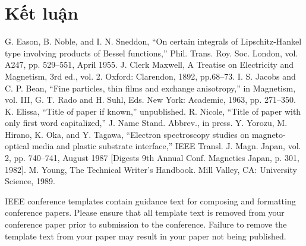 \documentclass[conference]{IEEEtran}
\theoremstyle{theoremst}
\begin{document}
\section{Kết luận}


\begin{thebibliography}{00}
 G. Eason, B. Noble, and I. N. Sneddon, ``On certain integrals of Lipschitz-Hankel type involving products of Bessel functions,'' Phil. Trans. Roy. Soc. London, vol. A247, pp. 529--551, April 1955.
 J. Clerk Maxwell, A Treatise on Electricity and Magnetism, 3rd ed., vol. 2. Oxford: Clarendon, 1892, pp.68--73.
 I. S. Jacobs and C. P. Bean, ``Fine particles, thin films and exchange anisotropy,'' in Magnetism, vol. III, G. T. Rado and H. Suhl, Eds. New York: Academic, 1963, pp. 271--350.
 K. Elissa, ``Title of paper if known,'' unpublished.
 R. Nicole, ``Title of paper with only first word capitalized,'' J. Name Stand. Abbrev., in press.
 Y. Yorozu, M. Hirano, K. Oka, and Y. Tagawa, ``Electron spectroscopy studies on magneto-optical media and plastic substrate interface,'' IEEE Transl. J. Magn. Japan, vol. 2, pp. 740--741, August 1987 [Digests 9th Annual Conf. Magnetics Japan, p. 301, 1982].
 M. Young, The Technical Writer's Handbook. Mill Valley, CA: University Science, 1989.
\end{thebibliography}
\vspace{12pt}
\color{red}
IEEE conference templates contain guidance text for composing and formatting conference papers. Please ensure that all template text is removed from your conference paper prior to submission to the conference. Failure to remove the template text from your paper may result in your paper not being published.
\end{document}
